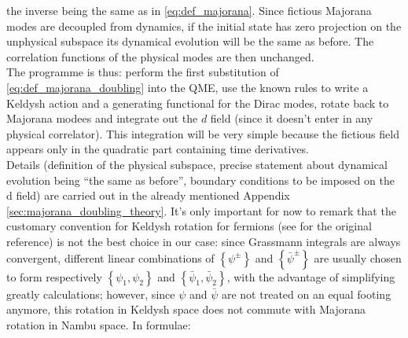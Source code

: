 \documentclass[a4paper,11pt]{article}
\theoremstyle{remark}
\newcommand{\psibar}{\bar{\psi}}
\begin{document}
  the inverse being the same as in \ref{eq:def_majorana}. Since fictious Majorana modes are decoupled from dynamics, if the initial state has zero projection on the unphysical subspace its dynamical evolution will be the same as before. The correlation functions of the physical modes are then unchanged.\\ The programme is thus: perform the first substitution of \ref{eq:def_majorana_doubling} into the QME, use the known rules to write a Keldysh action and a generating functional for the Dirac modes, rotate back to Majorana modees and integrate out the $d$ field (since it doesn't enter in any physical correlator). This integration will be very simple because the fictious field appears only in the quadratic part containing time derivatives.\\[0.3cm] Details (definition of the physical subspace, precise statement about dynamical evolution being ``the same as before'', boundary conditions to be imposed on the d field) are carried out in the already mentioned Appendix \ref{sec:majorana_doubling_theory}. It's only important for now to remark that the customary convention for Keldysh rotation for fermions (see \cite{Kamenev2011} for the original reference) is not the best choice in our case: since Grassmann integrals are always convergent, different linear combinations of $\left\{\psi^{\pm}\right\}$ and $\left\{\psibar^{\pm}\right\}$ are usually chosen to form respectively $\left\{\psi_1,\psi_2\right\}$ and $\left\{\psibar_1,\psibar_2\right\}$, with the advantage of simplifying greatly calculations; however, since $\psi$ and $\psibar$ are not treated on an equal footing anymore, this rotation in Keldysh space does not commute with Majorana rotation in Nambu space. In formulae:
\end{document}
